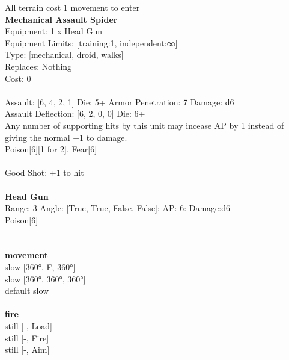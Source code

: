 \noindent All terrain cost 1 movement to enter\\ 


{\bf Mechanical Assault Spider } \\
Equipment: 1 x Head Gun \\
Equipment Limits: [training:1, independent:∞] \\
Type: [mechanical, droid, walks] \\
Replaces: Nothing \\
Cost: 0\\
\ \\
Assault: [6, 4, 2, 1] Die: 5+ Armor Penetration: 7 Damage: d6 \\
Assault Deflection: [6, 2, 0, 0] Die: 6+\\
\indent Any number of supporting hits by this unit may incease AP by 1 instead of giving the normal +1 to damage.\\ 
Poison[6][1 for 2], Fear[6]\\ 
 
\ \\
Good Shot: +1 to hit\\ 

\ \\
{\bf Head Gun } \\



Range: 3  Angle: [True, True, False, False]: AP: 6: Damage:d6 \\
Poison[6]\\ 




 
\ \\



\ \\ {\bf movement } \\
slow [360°, F, 360°] \\
slow [360°, 360°, 360°] \\
default slow \\
\ \\ {\bf fire } \\
still [-, Load] \\
still [-, Fire] \\
still [-, Aim] \\


